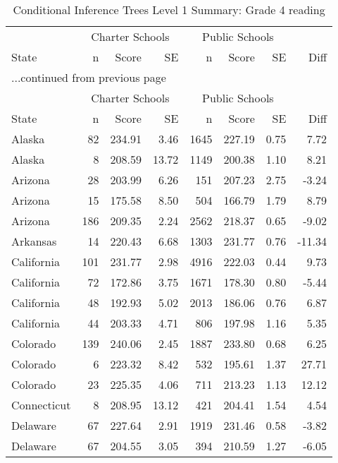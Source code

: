 \begin{longtable}{lrrr@{\extracolsep{10pt}}rrrr}
\caption{Conditional Inference Trees Level 1 Summary: Grade 4 reading} \\ 
  \hline
  & \multicolumn{3}{c}{Charter Schools} & \multicolumn{3}{c}{Public Schools} & \\ \cline{2-4} \cline{5-7} State & n & Score & SE & n & Score & SE & Diff \\ \endfirsthead \multicolumn{8}{l}{{...continued from previous page}}\\ \hline & \multicolumn{3}{c}{Charter Schools} & \multicolumn{3}{c}{Public Schools} & \\ \cline{2-4} \cline{5-7} State & n & Score & SE & n & Score & SE & Diff \\ \hline \endhead \hline \endfoot \endlastfoot \hline
Alaska &  82 & 234.91 & 3.46 & 1645 & 227.19 & 0.75 & 7.72 \\ 
  Alaska &   8 & 208.59 & 13.72 & 1149 & 200.38 & 1.10 & 8.21 \\ 
  Arizona &  28 & 203.99 & 6.26 & 151 & 207.23 & 2.75 & -3.24 \\ 
  Arizona &  15 & 175.58 & 8.50 & 504 & 166.79 & 1.79 & 8.79 \\ 
  Arizona & 186 & 209.35 & 2.24 & 2562 & 218.37 & 0.65 & -9.02 \\ 
  Arkansas &  14 & 220.43 & 6.68 & 1303 & 231.77 & 0.76 & -11.34 \\ 
  California & 101 & 231.77 & 2.98 & 4916 & 222.03 & 0.44 & 9.73 \\ 
  California &  72 & 172.86 & 3.75 & 1671 & 178.30 & 0.80 & -5.44 \\ 
  California &  48 & 192.93 & 5.02 & 2013 & 186.06 & 0.76 & 6.87 \\ 
  California &  44 & 203.33 & 4.71 & 806 & 197.98 & 1.16 & 5.35 \\ 
  Colorado & 139 & 240.06 & 2.45 & 1887 & 233.80 & 0.68 & 6.25 \\ 
  Colorado &   6 & 223.32 & 8.42 & 532 & 195.61 & 1.37 & 27.71 \\ 
  Colorado &  23 & 225.35 & 4.06 & 711 & 213.23 & 1.13 & 12.12 \\ 
  Connecticut &   8 & 208.95 & 13.12 & 421 & 204.41 & 1.54 & 4.54 \\ 
  Delaware &  67 & 227.64 & 2.91 & 1919 & 231.46 & 0.58 & -3.82 \\ 
  Delaware &  67 & 204.55 & 3.05 & 394 & 210.59 & 1.27 & -6.05 \\ 

\end{longtable}
